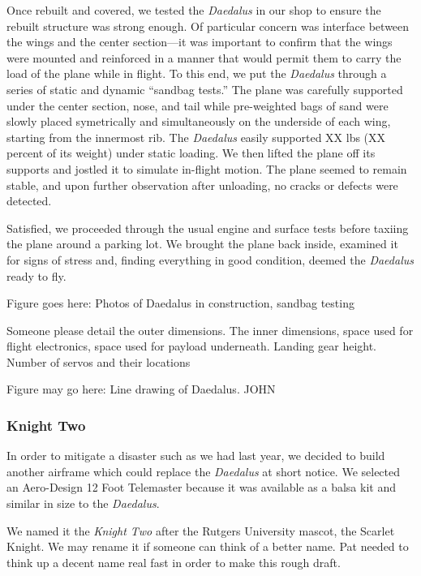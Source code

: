 \documentclass[10pt]{report}
\begin{document}
Once rebuilt and covered, we tested the \emph{Daedalus} in our shop to ensure the rebuilt structure was strong enough. Of particular concern was interface between the wings and the center section---it was important to confirm that the wings were mounted and reinforced in a manner that would permit them to carry the load of the plane while in flight.  To this end, we put the \emph{Daedalus} through a series of static and dynamic ``sandbag tests.''  The plane was carefully supported under the center section, nose, and tail while pre-weighted bags of sand were slowly placed symetrically and simultaneously on the underside of each wing, starting from the innermost rib.  The \emph{Daedalus} easily supported XX lbs (XX percent of its weight) under static loading.  We then lifted the plane off its supports and jostled it to simulate in-flight motion.  The plane seemed to remain stable, and upon further observation after unloading, no cracks or defects were detected.


Satisfied, we proceeded through the usual engine and surface tests before taxiing the plane around a parking lot.  We brought the plane back inside, examined it for signs of stress and, finding everything in good condition, deemed the \emph{Daedalus} ready to fly.


Figure goes here: Photos of Daedalus in construction, sandbag testing

Someone please detail the outer dimensions. The inner dimensions, space used for flight electronics, space used for payload underneath. Landing gear height. Number of servos and their locations

Figure may go here: Line drawing of Daedalus. JOHN

\subsubsection{Knight Two}

In order to mitigate a disaster such as we had last year, we decided to build another airframe which could replace the \emph{Daedalus} at short notice. We selected an Aero-Design 12 Foot Telemaster \cite{aerodesign} because it was available as a balsa kit and similar in size to the \emph{Daedalus}.

We named it the \emph{Knight Two} after the Rutgers University mascot, the Scarlet Knight. We may rename it if someone can think of a better name. Pat needed to think up a decent name real fast in order to make this rough draft.
\end{document}
